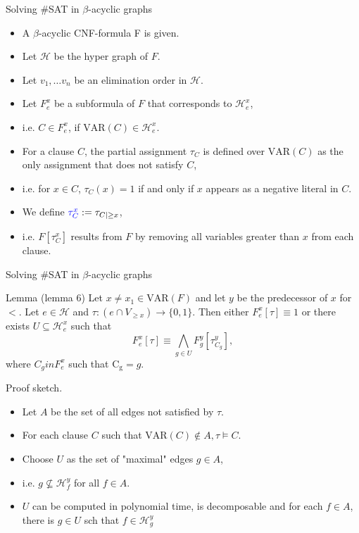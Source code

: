 \begin{frame}[t]{Solving \#SAT in $\beta$-acyclic graphs}
	\begin{itemize}[<+->]
	\item A $\beta$-acyclic CNF-formula F is given.
	\item Let $\mathcal{H}$ be the hyper graph of $F$.
	\item Let $v_1, \dots v_n$ be an elimination order in $\mathcal{H}$.
	\item Let {\color{blue}$F^x_e$} be a subformula of $F$ that corresponds to $\mathcal{H}^x_e$,
	\item[]\hspace{1cm}i.e. $C \in F^x_e$, if $\mathrm{VAR}(C) \in \mathcal{H}^x_e$.
	\item For a clause $C$, the partial assignment {\color{blue}$\tau_C$} is defined over $\mathrm{VAR}(C)$ as the only assignment that does not satisfy $C$,
	\item[]\hspace{1cm}i.e. for $x \in C$, $\tau_C(x) = 1$ if and only if $x$ appears as a negative literal in $C$.
	\item We define ${\color{blue}\tau^x_C} := \tau_{C|\geq x}$,
	\item[]\hspace{1cm}i.e. $F[\tau^x_C]$ results from $F$ by removing all variables greater than $x$ from each clause.
	\end{itemize}
\end{frame}
\begin{frame}[t]{Solving \#SAT in $\beta$-acyclic graphs}
	\begin{block}{Lemma (lemma 6)}
		Let $x \neq x_1 \in \mathrm{VAR}(F)$ and let $y$ be the predecessor of $x$ for $<$.  Let $e \in \mathcal{H}$ and $\tau : (e \cap V_{\geq x}) \rightarrow \{0, 1\}$. Then either $F^x_e[\tau] \equiv 1$ or there exists $U \subseteq \mathcal{H}^x_e$ such that 
		$$ F^x_e[\tau] \equiv \bigwedge\limits_{g \in U} F^y_g[\tau^y_{C_g}],$$
		where $C_g in F^x_e$ such that $\mathrm{C_g} = g$.
	\end{block}
	\pause
	Proof sketch.
	\begin{itemize}[<+->]
		\item Let $A$ be the set of all edges not satisfied by $\tau$. 
		\item For each clause $C$ such that $\mathrm{VAR}(C) \notin A, \tau \models C$.
		\item Choose $U$ as the set of "maximal" edges $g \in A$,
		\item[]\hspace{1cm}i.e. $g \not \subseteq \mathcal{H}^y_f$ for all $f \in A$.
		\item $U$ can be computed in polynomial time, is decomposable and for each $f \in A$, there is $g \in U$ sch that $f \in \mathcal{H}^y_g$
	\end{itemize}
\end{frame}

